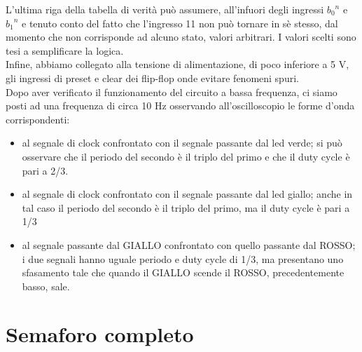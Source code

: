 L'ultima riga della tabella di verità può assumere, all'infuori degli ingressi ${b_0}^{n}$ e ${b_1}^{n}$ e tenuto conto del fatto che l'ingresso 11 non può tornare in sè stesso, dal momento che non corrisponde ad alcuno stato, valori arbitrari. I valori scelti sono tesi a semplificare la logica.\\ Infine, abbiamo collegato alla tensione di alimentazione, di poco inferiore a 5 V, gli ingressi di preset e clear dei flip-flop onde evitare fenomeni spuri.\\
Dopo aver verificato il funzionamento del circuito a bassa frequenza, ci siamo posti ad una frequenza di circa 10 Hz osservando all'oscilloscopio le forme d'onda corrispondenti:
\begin{itemize}
\item al segnale di clock confrontato con il segnale passante dal led verde; si può osservare che il periodo del secondo è il triplo del primo e che il duty cycle è pari a 2/3.
\item al segnale di clock confrontato con il segnale passante dal led giallo; anche in tal caso il periodo del secondo è il triplo del primo, ma il duty cycle è pari a 1/3
\item al segnale passante dal GIALLO confrontato con quello passante dal ROSSO; i due segnali hanno uguale periodo e duty cycle di 1/3, ma presentano uno sfasamento tale che quando il GIALLO scende il ROSSO, precedentemente basso, sale.
\end{itemize}

\section{Semaforo completo}



